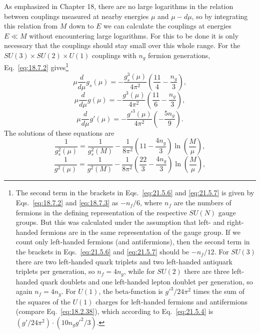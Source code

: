 As emphasized in Chapter 18, there are no large logarithms in the relation between couplings measured at nearby energies $\mu$ and $\mu-d\mu$, so by integrating this relation from $M$ down to $E$ we can calculate the couplings at energies $E\ll M$ without encountering large logarithms. For this to be done it is only necessary that the couplings should stay small over this whole range. For the $SU(3)\times SU(2)\times U(1)$ couplings with $n_g$ fermion generations, Eq.~\eqref{eq:18.7.2} gives\footnote{The second term in the brackets in Eqs.~\eqref{eq:21.5.6} and \eqref{eq:21.5.7} is given by Eqs.~\eqref{eq:18.7.2} and \eqref{eq:18.7.3} as $-n_f/6$, where $n_f$ are the numbers of fermions in the defining representation of the respective $SU(N)$ gauge groups. But this was calculated under the assumption that left- and right-handed fermions are in the same representation of the gauge group. If we count only left-handed fermions (and antifermions), then the second term in the brackets in Eqs.~\eqref{eq:21.5.6} and \eqref{eq:21.5.7} should be $-n_f/12$. For $SU(3)$ there are two left-handed quark triplets and two left-handed antiquark triplets per generation, so $n_f=4n_g$, while for $SU(2)$ there are three left-handed quark doublets and one left-handed lepton doublet per generation, so again $n_f=4n_g$. For $U(1)$, the beta-function is $g'^3/24\pi^2$ times the sum of the squares of the $U(1)$ charges for left-handed fermions and antifermions (compare Eq.~\eqref{eq:18.2.38}), which according to Eq.~\eqref{eq:21.5.4} is $(g'/24\pi^2)\cdot(10n_gg'^2/3)$.}
\begin{equation}
\mu\frac{d}{d\mu}g_s(\mu)
=-\frac{g_s^3(\mu)}{4\pi^2}
\left(\frac{11}{4}-\frac{n_g}{3}\right),
\tag{21.5.6}\label{eq:21.5.6}
\end{equation}
\begin{equation}
\mu\frac{d}{d\mu}g(\mu)
=-\frac{g^3(\mu)}{4\pi^2}
\left(\frac{11}{6}-\frac{n_g}{3}\right),
\tag{21.5.7}\label{eq:21.5.7}
\end{equation}
\begin{equation}
\mu\frac{d}{d\mu}g'(\mu)
=-\frac{g'^3(\mu)}{4\pi^2}
\left(-\frac{5n_g}{9}\right).
\tag{21.5.8}\label{eq:21.5.8}
\end{equation}
The solutions of these equations are
\begin{equation}
\frac{1}{g_s^2(\mu)}
=\frac{1}{g_s^2(M)}
-\frac{1}{8\pi^2}
\left(11-\frac{4n_g}{3}\right)
\ln\left(\frac{M}{\mu}\right),
\tag{21.5.9}\label{eq:21.5.9}
\end{equation}
\begin{equation}
\frac{1}{g^2(\mu)}
=\frac{1}{g^2(M)}
-\frac{1}{8\pi^2}
\left(\frac{22}{3}-\frac{4n_g}{3}\right)
\ln\left(\frac{M}{\mu}\right),
\tag{21.5.10}\label{eq:21.5.10}
\end{equation}
